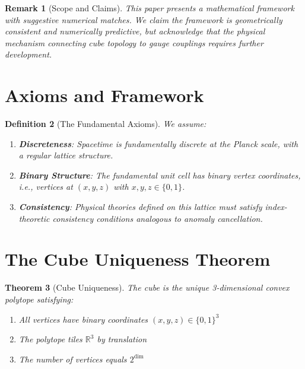 \documentclass[twocolumn,showpacs,preprintnumbers,amsmath,amssymb,prd]{revtex4-2}
\newtheorem{theorem}{Theorem}[section]
\newtheorem{definition}[theorem]{Definition}
\newtheorem{remark}[theorem]{Remark}
\begin{document}
\begin{remark}[Scope and Claims]
This paper presents a mathematical framework with suggestive numerical matches. We claim the framework is \emph{geometrically consistent} and \emph{numerically predictive}, but acknowledge that the physical mechanism connecting cube topology to gauge couplings requires further development.
\end{remark}

\section{Axioms and Framework}

\begin{definition}[The Fundamental Axioms]
We assume:
\begin{enumerate}
\item[\textbf{A1.}] \textbf{Discreteness}: Spacetime is fundamentally discrete at the Planck scale, with a regular lattice structure.
\item[\textbf{A2.}] \textbf{Binary Structure}: The fundamental unit cell has binary vertex coordinates, i.e., vertices at $(x,y,z)$ with $x,y,z \in \{0,1\}$.
\item[\textbf{A3.}] \textbf{Consistency}: Physical theories defined on this lattice must satisfy index-theoretic consistency conditions analogous to anomaly cancellation.
\end{enumerate}
\end{definition}

\section{The Cube Uniqueness Theorem}

\begin{theorem}[Cube Uniqueness]
\label{thm:cube}
The cube is the unique 3-dimensional convex polytope satisfying:
\begin{enumerate}
\item All vertices have binary coordinates $(x,y,z) \in \{0,1\}^3$
\item The polytope tiles $\mathbb{R}^3$ by translation
\item The number of vertices equals $2^{\dim}$
\end{enumerate}
\end{theorem}
\end{document}

